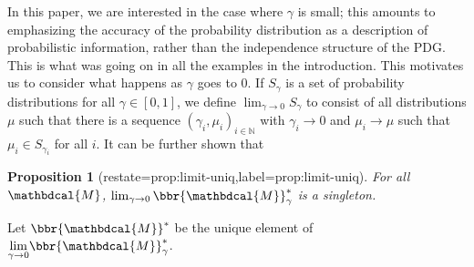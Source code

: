 \documentclass[letterpaper]{article} %
\theoremstyle{plain}
\newtheorem{prop}[theorem]{Proposition}
\theoremstyle{definition}
\theoremstyle{remark}
\let\H\relax
\DeclareMathOperator{\H}{\mathrm{H}} %
\DeclareMathOperator*{\E}{\mathbb{E}} %
\newcommand\mat[1]{\mathbf{#1}}
\newcommand{\commentout}[1]{\ignorespaces}
\newcommand{\bp}[1][L]{\mat{p}_{\!_{#1}\!}}
\newcommand{\dg}[1]{\mathbdcal{#1}}
\newcommand\Inc{\mathit{Inc}}
\newcommand{\ed}[3]{#2
  \overset{\smash{\mskip-5mu\raisebox{-1pt}{$\scriptscriptstyle
        #1$}}}{\rightarrow} #3}
\newcommand{\alle}[1][L]{_{ \ed {#1}XY}}
\newcommand{\begthm}[2]{\begin{#1}[restate=#2,label=#2]}
\begin{document}
In this paper, we are interested in the case where $\gamma$ is small;
this amounts to emphasizing the accuracy of the probability
distribution as a description of probabilistic information, rather than
the independence structure of the PDG.  This is what was going on in
all the examples in the introduction.  This motivates us to consider
what happens as $\gamma$ goes to 0.  If $S_\gamma$ is a set of
probability distributions for all $\gamma \in [0,1]$, we define
$\lim_{\gamma \rightarrow 0} 
S_\gamma$ to consist of all distributions $\mu$ such that 
there is a sequence $(\gamma_i, \mu_i)_{i \in \mathbb N}$ with
$\gamma_i \to 0$ and $\mu_i \to \mu$ such that $\mu_i \in
S_{\gamma_i}$ for all $i$. 
It can be further shown that 
\begthm{prop}{prop:limit-uniq}
    For all $\dg M$,
	$\lim_{\gamma\to0}\bbr{\dg M}_\gamma^*$ is a singleton.
\end{prop}
Let
$\bbr{{\dg M}}^*$ be the unique element of $\smash{\lim\limits_{\gamma
    \rightarrow 0}} \bbr{{\dg M}}_\gamma^*$. 
\commentout{
There is a unique such distribution because, as we now
show, the score is strongly convex
which can be found efficiently \cite{strongconvexopt}.
}
\commentout{
    \begin{prop}\label{prop:u-convex}
      $\bbr{\dg M}_\gamma(\mu)$ is $\gamma$-strongly convex.%
    \end{prop}
    \commentout{
    \begin{proof}
      $\Inc_{\dg M}( \mu)$ is convex in $\mu$
      (\Cref{thm:inc-convex}), and $\gamma\sum\alle \E_{x\sim \mu_X}
      \H(\bp(x))$ is linear in $\mu$.  
		Negative entropy is $1$-strongly convex
		(\Cref{prop:neg-ent-convex}), so $- \gamma \H(\mu)$ is $\gamma$-strongly convex.
		The sum of a $\gamma$-strongly convex, linear, and
        convex functions must be $\gamma$-strongly convex. 
	\end{proof}
    }
}%
\end{document}
